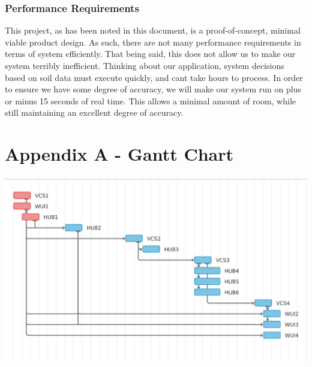 \documentclass[onecolumn, draftclsnofoot,10pt, compsoc]{IEEEtran}
\begin{document}
	\subsubsection{Performance Requirements}
	This project, as has been noted in this document, is a proof-of-concept, minimal viable product design.
	As such, there are not many performance requirements in terms of system efficiently.
	That being said, this does not allow us to make our system terribly inefficient. 
	Thinking about our application, system decisions based on soil data must execute quickly, and cant take hours to process. 
	In order to ensure we have some degree of accuracy, we will make our system run on plus or minus 15 seconds of real time. 
	This allows a minimal amount of room, while still maintaining an excellent degree of accuracy.\pagebreak
	\section{Appendix A - Gantt Chart}
	\vspace{2em}\includegraphics[scale=.875, angle=90]{chart_cropped}
	\pagebreak
	
	\nocite{*} %
	
	
	
\end{document}
